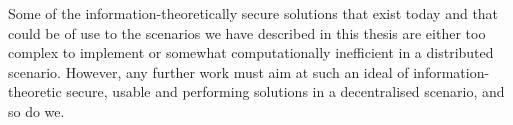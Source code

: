 Some of the information-theoretically secure solutions that exist today and that 
could be of use to the scenarios we have described in this thesis are either too 
complex to implement or somewhat computationally inefficient in a distributed scenario. 
However, any further work must aim at such an ideal of information-theoretic secure, 
usable and performing solutions in a decentralised scenario, and so do we.
